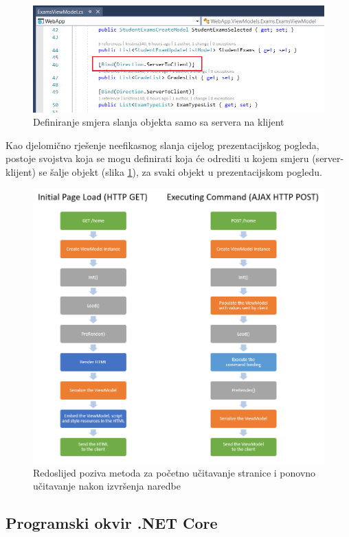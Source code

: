 \documentclass[times, utf8, diplomski]{fer}
\begin{document}
\begin{figure}[htb]
\centering
\includegraphics[width=12cm]{code_viewmodel.PNG}
\caption{Definiranje smjera slanja objekta samo sa servera na klijent}
\label{fig:bind_direction}
\end{figure}

Kao djelomično rješenje neefikasnog slanja cijelog prezentacijskog pogleda, postoje svojstva koja se mogu definirati koja će odrediti u kojem smjeru (server-klijent) se šalje objekt (slika \ref{fig:bind_direction}), za svaki objekt u prezentacijskom pogledu.



\begin{figure}[htb]
\centering
\includegraphics[width=14cm]{methods.png}
\caption{Redoslijed poziva metoda za početno učitavanje stranice i ponovno učitavanje nakon izvršenja naredbe}
\label{fig:methods}
\end{figure}


\subsection{Programski okvir .NET Core}
\end{document}
